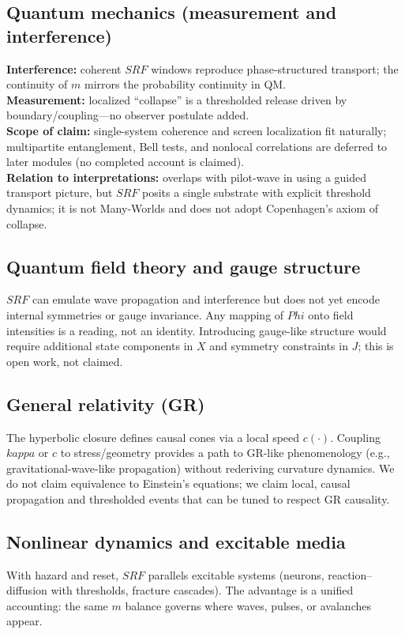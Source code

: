 \documentclass[12pt]{article}
\newcommand{\FoldDensity}{\Phi}
\newcommand{\Threshold}{\kappa}
\newcommand{\SRF}{\mathcal{F}_{\mathrm{SR}}}
\def\FoldDensity{Phi}%
\def\Threshold{kappa}%
\def\SRF{SRF}%
\def\mathcal#1{#1}%
\def\mathrm#1{#1}%
\begin{document}
\subsection{Quantum mechanics (measurement and interference)}
\textbf{Interference:} coherent $\SRF$ windows reproduce phase-structured transport; the continuity of $m$ mirrors the probability continuity in QM.\\
\textbf{Measurement:} localized ``collapse'' is a thresholded release driven by boundary/coupling---no observer postulate added.\\
\textbf{Scope of claim:} single-system coherence and screen localization fit naturally; multipartite entanglement, Bell tests, and nonlocal correlations are deferred to later modules (no completed account is claimed).\\
\textbf{Relation to interpretations:} overlaps with pilot-wave in using a guided transport picture, but $\SRF$ posits a single substrate with explicit threshold dynamics; it is not Many-Worlds and does not adopt Copenhagen's axiom of collapse.

\subsection{Quantum field theory and gauge structure}
$\SRF$ can emulate wave propagation and interference but does not yet encode internal symmetries or gauge invariance. Any mapping of $\FoldDensity$ onto field intensities is a reading, not an identity. Introducing gauge-like structure would require additional state components in $X$ and symmetry constraints in $J$; this is open work, not claimed.

\subsection{General relativity (GR)}
The hyperbolic closure defines causal cones via a local speed $c(\cdot)$. Coupling $\Threshold$ or $c$ to stress/geometry provides a path to GR-like phenomenology (e.g., gravitational-wave-like propagation) without rederiving curvature dynamics. We do not claim equivalence to Einstein's equations; we claim local, causal propagation and thresholded events that can be tuned to respect GR causality.

\subsection{Nonlinear dynamics and excitable media}
With hazard and reset, $\SRF$ parallels excitable systems (neurons, reaction--diffusion with thresholds, fracture cascades). The advantage is a unified accounting: the same $m$ balance governs where waves, pulses, or avalanches appear.
\end{document}
